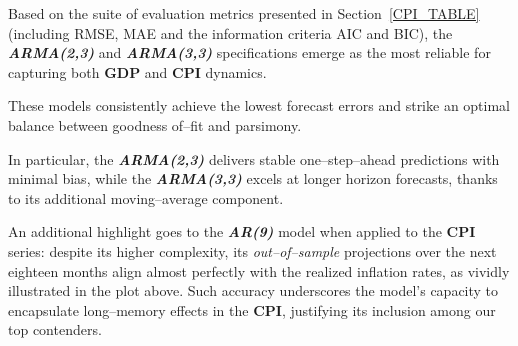 \documentclass{Configuration_Files/PoliMi3i_thesis}
\begin{document}
Based on the suite of evaluation metrics presented in Section~\ref{CPI_TABLE} (including RMSE, MAE and the information criteria AIC and BIC), the \textbf{\textit{ARMA(2,3)}} and \textbf{\textit{ARMA(3,3)}} specifications emerge as the most reliable for capturing both \textbf{GDP} and \textbf{CPI} dynamics. 

These models consistently achieve the lowest forecast errors and strike an optimal balance between goodness of–fit and parsimony.  

In particular, the \textbf{\textit{ARMA(2,3)}} delivers stable one–step–ahead predictions with minimal bias, while the \textbf{\textit{ARMA(3,3)}} excels at longer horizon forecasts, thanks to its additional moving–average component.

An additional highlight goes to the \textbf{\textit{AR(9)}} model when applied to the \textbf{CPI} series: despite its higher complexity, its \textit{out–of–sample} projections over the next eighteen months align almost perfectly with the realized inflation rates, as vividly illustrated in the plot above.  Such accuracy underscores the model’s capacity to encapsulate long–memory effects in the \textbf{CPI}, justifying its inclusion among our top contenders.
\end{document}
